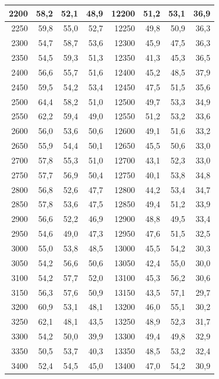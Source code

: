 \begin{small}
\begin{longtable}{|r|r|r|r|r|r|r|r|}
2200 & 58,2 & 52,1 & 48,9 & 12200 & 51,2 & 53,1 & 36,9 \\ \hline
2250 & 59,8 & 55,0 & 52,7 & 12250 & 49,8 & 50,9 & 36,3 \\ \hline
2300 & 54,7 & 58,7 & 53,6 & 12300 & 45,9 & 47,5 & 36,3 \\ \hline
2350 & 54,5 & 59,3 & 51,3 & 12350 & 41,3 & 45,3 & 36,5 \\ \hline
2400 & 56,6 & 55,7 & 51,6 & 12400 & 45,2 & 48,5 & 37,9 \\ \hline
2450 & 59,5 & 54,2 & 53,4 & 12450 & 47,5 & 51,5 & 35,6 \\ \hline
2500 & 64,4 & 58,2 & 51,0 & 12500 & 49,7 & 53,3 & 34,9 \\ \hline
2550 & 62,2 & 59,4 & 49,0 & 12550 & 51,2 & 53,2 & 33,6 \\ \hline
2600 & 56,0 & 53,6 & 50,6 & 12600 & 49,1 & 51,6 & 33,2 \\ \hline
2650 & 55,9 & 54,4 & 50,1 & 12650 & 45,5 & 50,6 & 33,0 \\ \hline
2700 & 57,8 & 55,3 & 51,0 & 12700 & 43,1 & 52,3 & 33,0 \\ \hline
2750 & 57,7 & 56,9 & 50,4 & 12750 & 40,1 & 53,8 & 34,8 \\ \hline
2800 & 56,8 & 52,6 & 47,7 & 12800 & 44,2 & 53,4 & 34,7 \\ \hline
2850 & 57,8 & 53,6 & 47,5 & 12850 & 49,4 & 51,2 & 33,9 \\ \hline
2900 & 56,6 & 52,2 & 46,9 & 12900 & 48,8 & 49,5 & 33,4 \\ \hline
2950 & 54,6 & 49,0 & 47,3 & 12950 & 47,6 & 51,5 & 32,5 \\ \hline
3000 & 55,0 & 53,8 & 48,5 & 13000 & 45,5 & 54,2 & 30,3 \\ \hline
3050 & 54,2 & 56,6 & 50,6 & 13050 & 42,4 & 55,0 & 30,0 \\ \hline
3100 & 54,2 & 57,7 & 52,0 & 13100 & 45,3 & 56,2 & 30,6 \\ \hline
3150 & 56,3 & 57,6 & 50,9 & 13150 & 43,5 & 57,1 & 29,7 \\ \hline
3200 & 60,9 & 53,1 & 48,1 & 13200 & 46,0 & 55,1 & 30,2 \\ \hline
3250 & 62,1 & 48,1 & 43,5 & 13250 & 48,9 & 52,3 & 31,7 \\ \hline
3300 & 54,2 & 50,0 & 39,9 & 13300 & 49,4 & 49,8 & 32,9 \\ \hline
3350 & 50,5 & 53,7 & 40,3 & 13350 & 48,5 & 53,2 & 32,4 \\ \hline
3400 & 52,4 & 54,5 & 45,0 & 13400 & 47,0 & 54,2 & 30,9 \\ \hline

\end{longtable}
\end{small}
